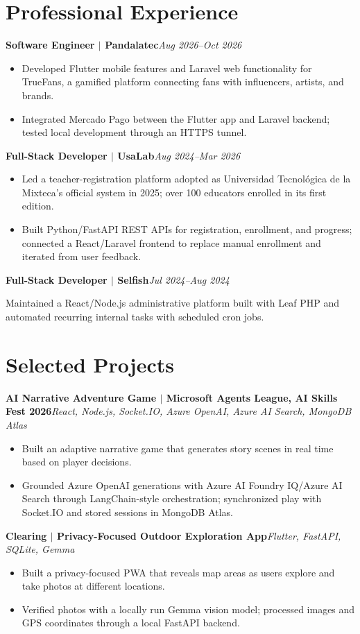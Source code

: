 \documentclass[10pt,letterpaper]{article}
\newcommand{\job}[2]{\textbf{#1}\hfill\textit{#2}\par\vspace{-1pt}}
\newcommand{\project}[2]{\textbf{#1}\hspace{3pt}\textit{\small #2}\par\vspace{-2pt}}
\begin{document}
\section*{Professional Experience}
\job{Software Engineer $|$ Pandalatec}{Aug 2026--Oct 2026}
\begin{itemize}
  \item Developed Flutter mobile features and Laravel web functionality for TrueFans, a gamified platform connecting fans with influencers, artists, and brands.
  \item Integrated Mercado Pago between the Flutter app and Laravel backend; tested local development through an HTTPS tunnel.
\end{itemize}

\job{Full-Stack Developer $|$ UsaLab}{Aug 2024--Mar 2026}
\begin{itemize}
  \item Led a teacher-registration platform adopted as Universidad Tecnológica de la Mixteca's official system in 2025; over 100 educators enrolled in its first edition.
  \item Built Python/FastAPI REST APIs for registration, enrollment, and progress; connected a React/Laravel frontend to replace manual enrollment and iterated from user feedback.
\end{itemize}

\job{Full-Stack Developer $|$ Selfish}{Jul 2024--Aug 2024}
Maintained a React/Node.js administrative platform built with Leaf PHP and automated recurring internal tasks with scheduled cron jobs.

\section*{Selected Projects}
\project{AI Narrative Adventure Game $|$ Microsoft Agents League, AI Skills Fest 2026}{React, Node.js, Socket.IO, Azure OpenAI, Azure AI Search, MongoDB Atlas}
\begin{itemize}
  \item Built an adaptive narrative game that generates story scenes in real time based on player decisions.
  \item Grounded Azure OpenAI generations with Azure AI Foundry IQ/Azure AI Search through LangChain-style orchestration; synchronized play with Socket.IO and stored sessions in MongoDB Atlas.
\end{itemize}

\project{Clearing $|$ Privacy-Focused Outdoor Exploration App}{Flutter, FastAPI, SQLite, Gemma}
\begin{itemize}
  \item Built a privacy-focused PWA that reveals map areas as users explore and take photos at different locations.
  \item Verified photos with a locally run Gemma vision model; processed images and GPS coordinates through a local FastAPI backend.
\end{itemize}
\end{document}
